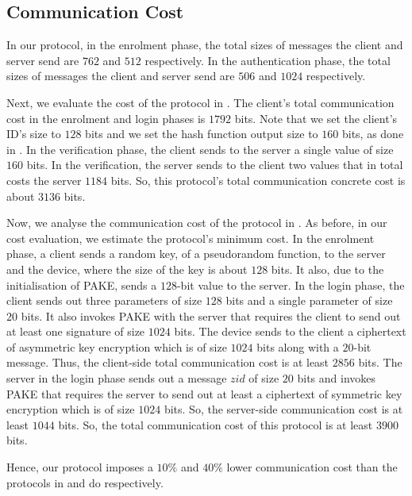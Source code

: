 \vspace{-3mm}
\subsection{Communication Cost}

In our protocol, in the enrolment phase, the total sizes of messages the client and server send are $762$ and $512$ respectively. In the authentication phase, the total sizes of messages the client and server send are $506$ and $1024$ respectively. 


Next, we evaluate the cost of the protocol in \cite{WangW18}. The client's total communication cost in the enrolment and login phases is $1792$ bits. Note that we set the client's ID's size to $128$ bits and we set the hash function output size to $160$ bits, as done in \cite{WangW18}. In the verification phase, the client sends to the server a single value of size $160$ bits. In the verification, the server sends to the client two values that in total costs the server $1184$ bits. So, this protocol's total communication concrete cost is about $3136$ bits.%


Now, we analyse the communication cost of the protocol in \cite{JareckiJKSS21}. As before, in our cost evaluation, we estimate the protocol's minimum cost.  In the enrolment phase, a client sends a random key, of a pseudorandom function, to the server and the device, where the size of the key is about $128$ bits. It also, due to the initialisation of PAKE, sends a $128$-bit value to the server. In the login phase, the client sends out three parameters of size $128$ bits and a single parameter of size $20$ bits.  It also invokes PAKE with the server that requires the client to send out at least one signature of size $1024$ bits. The device sends to the client a ciphertext of asymmetric key encryption which is of size $1024$ bits along with a $20$-bit message. Thus, the client-side total communication cost is at least $2856$ bits. The server in the login phase sends out a message $zid$ of size $20$ bits and invokes PAKE that requires the server to send out at least a ciphertext of symmetric key encryption which is of size $1024$ bits.  So, the server-side communication cost is at least $1044$ bits. So, the total communication cost of this protocol is at least $3900$ bits. 





Hence, our protocol imposes a $10\%$ and $40\%$ lower communication cost than the protocols in \cite{WangW18} and \cite{JareckiJKSS21} do respectively.

